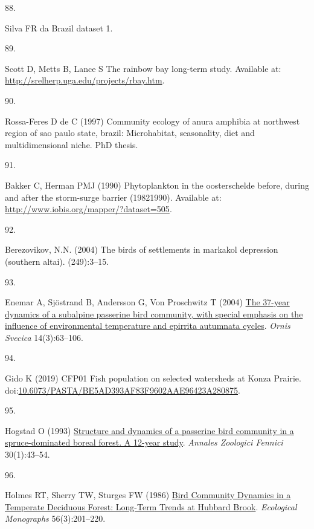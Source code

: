\documentclass{article}
\newlength{\cslhangindent}
\newlength{\csllabelwidth}
\newlength{\cslentryspacingunit} %
\newenvironment{CSLReferences}[2] %
 {%
  \setlength{\parindent}{0pt}
  \ifodd #1
  \let\oldpar\par
  \def\par{\hangindent=\cslhangindent\oldpar}
  \fi
  \setlength{\parskip}{#2\cslentryspacingunit}
 }%
 {}
\newcommand{\CSLLeftMargin}[1]{\parbox[t]{\csllabelwidth}{#1}}
\newcommand{\CSLRightInline}[1]{\parbox[t]{\linewidth - \csllabelwidth}{#1}\break}
\begin{document}
\begin{CSLReferences}{0}{0}
\leavevmode{}%
\CSLLeftMargin{88. }%
\CSLRightInline{Silva FR da Brazil dataset 1.}

\leavevmode{}%
\CSLLeftMargin{89. }%
\CSLRightInline{Scott D, Metts B, Lance S The rainbow bay long-term
study. Available at: \url{http://srelherp.uga.edu/projects/rbay.htm}.}

\leavevmode{}%
\CSLLeftMargin{90. }%
\CSLRightInline{Rossa-Feres D de C (1997) Community ecology of anura
amphibia at northwest region of sao paulo state, brazil: Microhabitat,
seasonality, diet and multidimensional niche. PhD thesis.}

\leavevmode{}%
\CSLLeftMargin{91. }%
\CSLRightInline{Bakker C, Herman PMJ (1990) Phytoplankton in the
oosterschelde before, during and after the storm-surge barrier
(1982{\textendash}1990). Available at:
\url{http://www.iobis.org/mapper/?dataset=505}.}

\leavevmode{}%
\CSLLeftMargin{92. }%
\CSLRightInline{Berezovikov, N.N. (2004) The birds of settlements in
markakol depression (southern altai). (249):3--15.}

\leavevmode{}%
\CSLLeftMargin{93. }%
\CSLRightInline{Enemar A, Sjöstrand B, Andersson G, Von Proschwitz T
(2004) \href{https://doi.org/10.34080/os.v14.20236}{The 37-year dynamics
of a subalpine passerine bird community, with special emphasis on the
influence of environmental temperature and epirrita autumnata cycles}.
\emph{Ornis Svecica} 14(3):63--106.}

\leavevmode{}%
\CSLLeftMargin{94. }%
\CSLRightInline{Gido K (2019) CFP01 Fish population on selected
watersheds at Konza Prairie.
doi:\href{https://doi.org/10.6073/PASTA/BE5AD393AF83F9602AAE96423A280875}{10.6073/PASTA/BE5AD393AF83F9602AAE96423A280875}.}

\leavevmode{}%
\CSLLeftMargin{95. }%
\CSLRightInline{Hogstad O (1993)
\href{https://www.jstor.org/stable/23735355}{Structure and dynamics of a
passerine bird community in a spruce-dominated boreal forest. A 12-year
study}. \emph{Annales Zoologici Fennici} 30(1):43--54.}

\leavevmode{}%
\CSLLeftMargin{96. }%
\CSLRightInline{Holmes RT, Sherry TW, Sturges FW (1986)
\href{https://doi.org/10.2307/2937074}{Bird Community Dynamics in a
Temperate Deciduous Forest: Long-Term Trends at Hubbard Brook}.
\emph{Ecological Monographs} 56(3):201--220.}


\end{CSLReferences}
\end{document}

